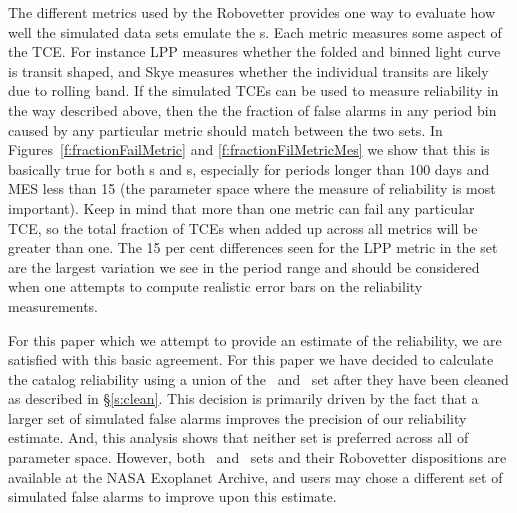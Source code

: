 The different metrics used by the Robovetter provides one way to evaluate how well the simulated data sets emulate the \opstce s.  Each metric measures some aspect of the TCE. For instance LPP measures whether the folded and binned light curve is transit shaped, and Skye measures whether the individual transits are likely due to rolling band.  If the simulated TCEs can be used to measure reliability in the way described above, then the the fraction of false alarms in any period bin caused by any particular metric should match between the two sets.  In Figures~\ref{f:fractionFailMetric} and \ref{f:fractionFilMetricMes} we show that this is basically true for both \invtce s and \scrtce s, especially for periods longer than 100 days and MES less than 15 (the parameter space where the measure of reliability is most important).  Keep in mind that more than one metric can fail any particular TCE, so the total fraction of TCEs when added up across all metrics will be greater than one.  The 15 per cent differences seen for the LPP metric in the \invtce set are the largest variation we see in the period range and should be considered when one attempts to compute realistic error bars on the reliability measurements. 

For this paper which we attempt to provide an estimate of the reliability, we are satisfied with this basic agreement. For this paper we have decided to calculate the catalog reliability using a union of the \scrtce\ and \invtce\ set after they have been cleaned as described in \S\ref{s:clean}.  This decision is primarily driven by the fact that a larger set of simulated false alarms improves the precision of our reliability estimate.  And, this analysis shows that neither set is preferred across all of parameter space. However, both \scrtce\ and \invtce\ sets and their Robovetter dispositions are available at the NASA Exoplanet Archive, and users may chose a different set of simulated false alarms to improve upon this estimate.  

